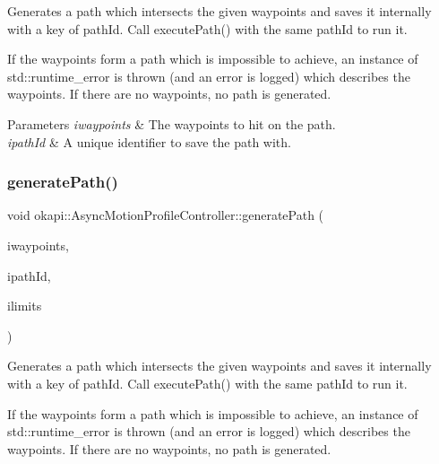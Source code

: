 Generates a path which intersects the given waypoints and saves it internally with a key of path\+Id. Call execute\+Path() with the same path\+Id to run it.

If the waypoints form a path which is impossible to achieve, an instance of std\+::runtime\+\_\+error is thrown (and an error is logged) which describes the waypoints. If there are no waypoints, no path is generated.


\begin{DoxyParams}{Parameters}
{\em iwaypoints} & The waypoints to hit on the path. \\
\hline
{\em ipath\+Id} & A unique identifier to save the path with. \\
\hline
\end{DoxyParams}
\mbox{\label{classokapi_1_1AsyncMotionProfileController_ada198a8805433f0ed8608577dc83dc5f}} 
\subsubsection{\texorpdfstring{generatePath()}{generatePath()}\hspace{0.1cm}{\footnotesize\ttfamily [2/2]}}
{\footnotesize\ttfamily void okapi\+::\+Async\+Motion\+Profile\+Controller\+::generate\+Path (\begin{DoxyParamCaption}\item[{std\+::initializer\+\_\+list$<$ \mbox{\hyperlink{structokapi_1_1Point}{Point}} $>$}]{iwaypoints,  }\item[{const std\+::string \&}]{ipath\+Id,  }\item[{const \mbox{\hyperlink{structokapi_1_1PathfinderLimits}{Pathfinder\+Limits}} \&}]{ilimits }\end{DoxyParamCaption})}

Generates a path which intersects the given waypoints and saves it internally with a key of path\+Id. Call execute\+Path() with the same path\+Id to run it.

If the waypoints form a path which is impossible to achieve, an instance of std\+::runtime\+\_\+error is thrown (and an error is logged) which describes the waypoints. If there are no waypoints, no path is generated.


